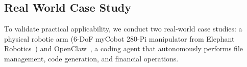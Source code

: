 

\subsection{Real World Case Study}
\label{subsec:real_world}
To validate practical applicability, we conduct two real-world case studies: a physical robotic arm (6-DoF myCobot 280-Pi manipulator from Elephant Robotics~\cite{elephant}) and OpenClaw~\cite{openclaw}, a coding agent that autonomously performs file management, code generation, and financial operations.


